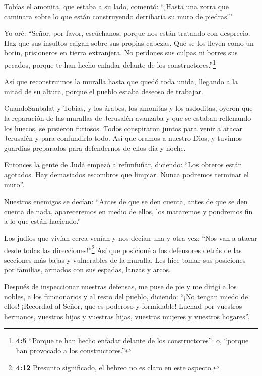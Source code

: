  Tobías el amonita, que estaba a su lado, comentó: ``¡Hasta
una zorra que caminara sobre lo que están construyendo derribaría su
muro de piedras!''

 Yo oré: ``Señor, por favor, escúchanos, porque nos están
tratando con desprecio. Haz que sus insultos caigan sobre sus propias
cabezas. Que se los lleven como un botín, prisioneros en tierra
extranjera.  No perdones sus culpas ni borres sus pecados,
porque te han hecho enfadar delante de los constructores.''\footnote{\textbf{4:5}
  ``Porque te han hecho enfadar delante de los constructores'': o,
  ``porque han provocado a los constructores.''}

 Así que reconstruimos la muralla hasta que quedó toda
unida, llegando a la mitad de su altura, porque el pueblo estaba deseoso
de trabajar.

 CuandoSanbalat y Tobías, y los árabes, los amonitas y los
asdoditas, oyeron que la reparación de las murallas de Jerusalén
avanzaba y que se estaban rellenando los huecos, se pusieron furiosos.
 Todos conspiraron juntos para venir a atacar Jerusalén y
para confundirlo todo.  Así que oramos a nuestro Dios, y
tuvimos guardias preparados para defendernos de ellos día y noche.

 Entonces la gente de Judá empezó a refunfuñar, diciendo:
``Los obreros están agotados. Hay demasiados escombros que limpiar.
Nunca podremos terminar el muro''.

 Nuestros enemigos se decían: ``Antes de que se den cuenta,
antes de que se den cuenta de nada, apareceremos en medio de ellos, los
mataremos y pondremos fin a lo que están haciendo.''

 Los judíos que vivían cerca venían y nos decían una y otra
vez: ``Nos van a atacar desde todas las direcciones!''\footnote{\textbf{4:12}
  Presunto significado, el hebreo no es claro en este aspecto.}
 Así que posicioné a los defensores detrás de las secciones
más bajas y vulnerables de la muralla. Les hice tomar sus posiciones por
familias, armados con sus espadas, lanzas y arcos.

 Después de inspeccionar nuestras defensas, me puse de pie
y me dirigí a los nobles, a los funcionarios y al resto del pueblo,
diciendo: ``¡No tengan miedo de ellos! ¡Recordad al Señor, que es
poderoso y formidable! Luchad por vuestros hermanos, vuestros hijos y
vuestras hijas, vuestras mujeres y vuestros hogares''.

